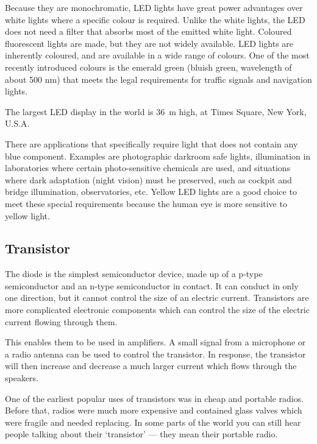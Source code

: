 Because they are monochromatic, LED lights have great power advantages over white lights where a specific colour is required. Unlike the white lights, the LED does not need a filter that absorbs most of the emitted white light. Coloured fluorescent lights are made, but they are not widely available. LED lights are inherently coloured, and are available in a wide range of colours. One of the most recently introduced colours is the emerald green (bluish green, wavelength of about 500 nm) that meets the legal requirements for traffic signals and navigation lights. 

\begin{IFact}{The largest LED display in the world is 36~m high, at Times Square, New York, U.S.A.}
\end{IFact}

There are applications that specifically require light that does not contain any blue component. Examples are photographic darkroom safe lights, illumination in laboratories where certain photo-sensitive chemicals are used, and situations where dark adaptation (night vision) must be preserved, such as cockpit and bridge illumination, observatories, etc. Yellow LED lights are a good choice to meet these special requirements because the human eye is more sensitive to yellow light.


\subsection{Transistor}
The diode is the simplest semiconductor device, made up of a p-type semiconductor and an n-type semiconductor in contact. It can conduct in only one direction, but it cannot control the size of an electric current.  Transistors are more complicated electronic components which can control the size of the electric current flowing through them.  

This enables them to be used in amplifiers.  A small signal from a microphone or a radio antenna can be used to control the transistor.  In response, the transistor will then increase and decrease a much larger current which flows through the speakers.

\begin{IFact}{One of the earliest popular uses of transistors was in cheap and portable radios.  Before that, radios were much more expensive and contained glass valves which were fragile and needed replacing.  In some parts of the world you can still hear people talking about their `transistor' --- they mean their portable radio.}\end{IFact}

